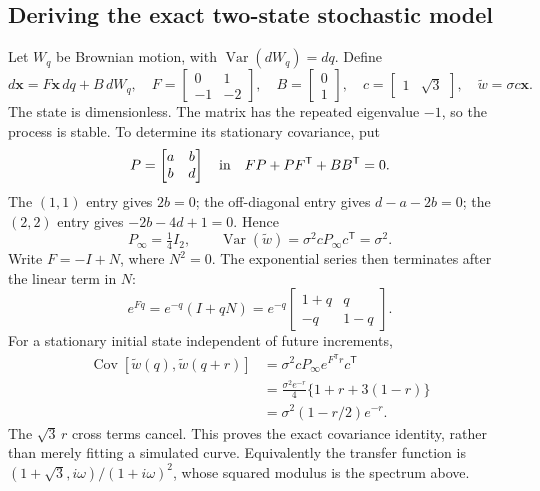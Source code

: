 \documentclass[11pt,a4paper]{article}
\numberwithin{equation}{section}
\begin{document}
\subsection{Deriving the exact two-state stochastic model}
Let $W_q$ be Brownian motion, with $\operatorname{Var}(dW_q)=dq$. Define
\begin{equation}
 d\mathbf x=F\mathbf x\,dq+B\,dW_q,
 \quad F=\begin{bmatrix}0&1\\-1&-2\end{bmatrix},
 \quad B=\begin{bmatrix}0\\1\end{bmatrix},
 \quad c=\begin{bmatrix}1&\sqrt3\end{bmatrix},
 \quad \widetilde w=\sigma c\mathbf x.
\end{equation}
The state is dimensionless. The matrix has the repeated eigenvalue $-1$, so the process is stable. To determine its stationary covariance, put
\begin{equation}
 P=\begin{bmatrix}a&b\\b&d\end{bmatrix}
 \quad\hbox{in}\quad FP+PF^{\mathsf T}+BB^{\mathsf T}=0.
\end{equation}
The $(1,1)$ entry gives $2b=0$; the off-diagonal entry gives $d-a-2b=0$; the $(2,2)$ entry gives $-2b-4d+1=0$. Hence
\begin{equation}
 \boxed{P_\infty=\tfrac14 I_2,\qquad \operatorname{Var}(\widetilde w)=\sigma^2 cP_\infty c^{\mathsf T}=\sigma^2.}
\end{equation}
Write $F=-I+N$, where $N^2=0$. The exponential series then terminates after the linear term in $N$:
\begin{equation}
 e^{Fq}=e^{-q}(I+qN)
 =e^{-q}\begin{bmatrix}1+q&q\\-q&1-q\end{bmatrix}.
\end{equation}
For a stationary initial state independent of future increments,
\begin{align}
 \operatorname{Cov}[\widetilde w(q),\widetilde w(q+r)]
 &=\sigma^2 cP_\infty e^{F^{\mathsf T}r}c^{\mathsf T}\\
 &=\frac{\sigma^2 e^{-r}}4\{1+r+3(1-r)\}\\
 &=\boxed{\sigma^2(1-r/2)e^{-r}}.
\end{align}
The $\sqrt3\,r$ cross terms cancel. This proves the exact covariance identity, rather than merely fitting a simulated curve. Equivalently the transfer function is $(1+\sqrt3,i\omega)/(1+i\omega)^2$, whose squared modulus is the spectrum above.
\end{document}
